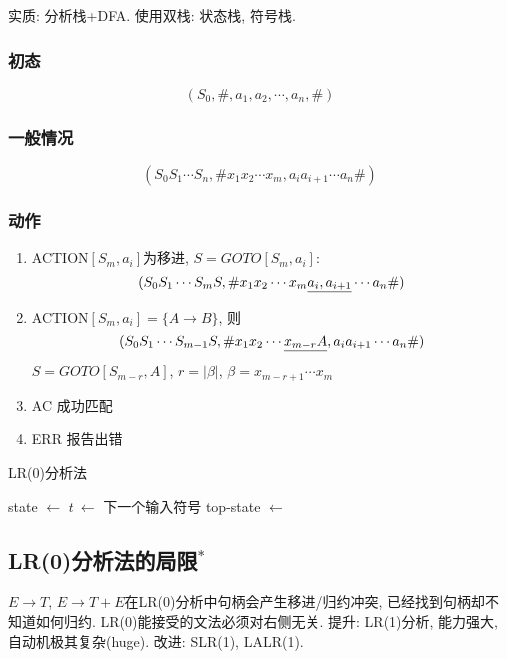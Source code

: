             实质: 分析栈+DFA. 使用双栈: 状态栈, 符号栈.

            \subsubsection{初态}

                \[(S_0, \#, a_1,a_2, \cdots, a_n, \#)\]

            \subsubsection{一般情况}

                \[(S_0S_1\cdots S_n, \#x_1x_2\cdots x_m, a_ia_{i+1}\cdots a_n\#)\]

            \subsubsection{动作}

                \begin{enumerate}
                    \item ACTION$[S_m,a_i]$为移进, $S=GOTO[S_m,a_i]$:
                        \[(S_0S_1\cdots S_mS, \#x_1x_2\cdots x_m\uline{a_i, a_{i+1}}\cdots a_n\#)\]
                    \item ACTION$[S_m,a_i]=\{A\to B\}$, 则
                        \[(S_0S_1\cdots S_{m-1}S, \#x_1x_2\cdots \uline{x_{m-r}A}, a_ia_{i+1}\cdots a_n\#)\]
                        $S=GOTO[S_{m-r},A]$, $r=|\beta|$, $\beta=x_{m-r+1}\cdots x_m$
                    \item AC \hfill 成功匹配
                    \item ERR \hfill 报告出错
                \end{enumerate}

                \begin{algorithm}
                    \caption{LR(0)分析法}
                    \label{algorithm-lr0}
                    \begin{algorithmic}[1]
                                \State state $\gets$ 
                                    \State $t\ \gets$ 下一个输入符号
                                    \State {}
                                    \State {}
                                    \State top-state $\gets$ 
                                    \State {}
                                \Else
                                    \State {}
                                \EndIf
                            \EndWhile
                        \EndProcedure
                    \end{algorithmic}
                \end{algorithm}

        \subsection{LR(0)分析法的局限$^*$}

            $E\to T$, $E\to T+E$在LR(0)分析中句柄会产生移进/归约冲突, 已经找到句柄却不知道如何归约. LR(0)能接受的文法必须对右侧无关. 提升: LR(1)分析, 能力强大, 自动机极其复杂(huge). 改进: SLR(1), LALR(1).
